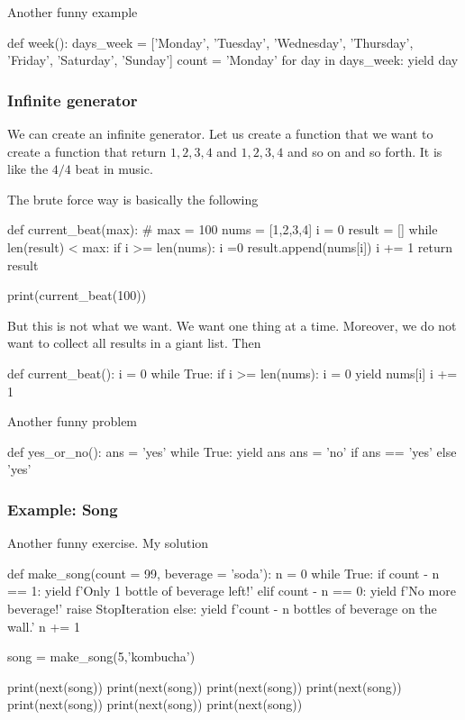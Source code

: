 Another funny example 
\begin{listing}{1}
def week():    
    days_week = ['Monday', 'Tuesday', 'Wednesday',
    'Thursday', 'Friday', 'Saturday', 'Sunday']
    count = 'Monday'
    for day in days_week:
        yield day    
\end{listing}

\subsubsection{Infinite generator}

We can create an infinite generator. Let us create a function that we want to create a function that return \(1,2,3,4\) and \(1,2,3,4\) and so on and so forth. It is like the \(4/4\) beat in music. 

The brute force way is basically the following
\begin{listing}{1}
def current_beat(max):    
    # max = 100
    nums = [1,2,3,4]
    i = 0
    result = []
    while len(result) < max:
        if i >= len(nums): i =0
        result.append(nums[i])
        i += 1
    return result

print(current_beat(100))    
\end{listing}
But this is not what we want. We want one thing at a time. Moreover, we do not want to collect all results in a giant list. Then 
\begin{listing}{1}
def current_beat():
    i = 0
    while True:
        if i >= len(nums): i = 0
        yield nums[i]
        i += 1
\end{listing}

Another funny problem 
\begin{listing}{1}
def yes_or_no():
    ans = 'yes'
    while True:
        yield ans
        ans = 'no' if ans == 'yes' else 'yes'    
\end{listing}

\subsubsection{Example: Song}

Another funny exercise. My solution
\begin{listing}{1}
def make_song(count = 99, beverage = 'soda'):
    n = 0
    while True: 
        if count - n == 1:
            yield f'Only 1 bottle of {beverage} left!'
        elif count - n == 0:
            yield f'No more {beverage}!'
            raise StopIteration
        else: 
            yield f'{count - n} bottles of {beverage} on the wall.'
        n += 1            

song = make_song(5,'kombucha')

print(next(song))
print(next(song))
print(next(song))
print(next(song))
print(next(song))
print(next(song))
print(next(song))    
\end{listing}

